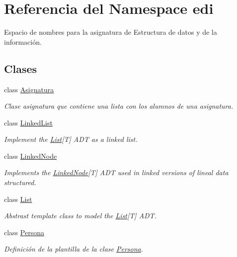 \hypertarget{namespaceedi}{\section{Referencia del Namespace edi}
\label{namespaceedi}
}


Espacio de nombres para la asignatura de Estructura de datos y de la información.  


\subsection*{Clases}
\begin{DoxyCompactItemize}
\item 
class \hyperlink{classedi_1_1Asignatura}{Asignatura}
\begin{DoxyCompactList}\small\item\em Clase asignatura que contiene una lista con los alumnos de una asignatura. \end{DoxyCompactList}\item 
class \hyperlink{classedi_1_1LinkedList}{Linked\+List}
\begin{DoxyCompactList}\small\item\em Implement the \hyperlink{classedi_1_1List}{List}\mbox{[}T\mbox{]} A\+D\+T as a linked list. \end{DoxyCompactList}\item 
class \hyperlink{classedi_1_1LinkedNode}{Linked\+Node}
\begin{DoxyCompactList}\small\item\em Implements the \hyperlink{classedi_1_1LinkedNode}{Linked\+Node}\mbox{[}T\mbox{]} A\+D\+T used in linked versions of lineal data structured. \end{DoxyCompactList}\item 
class \hyperlink{classedi_1_1List}{List}
\begin{DoxyCompactList}\small\item\em Abstrast template class to model the \hyperlink{classedi_1_1List}{List}\mbox{[}T\mbox{]} A\+D\+T. \end{DoxyCompactList}\item 
class \hyperlink{classedi_1_1Persona}{Persona}
\begin{DoxyCompactList}\small\item\em Definición de la plantilla de la clase \hyperlink{classedi_1_1Persona}{Persona}. \end{DoxyCompactList}\end{DoxyCompactItemize}

